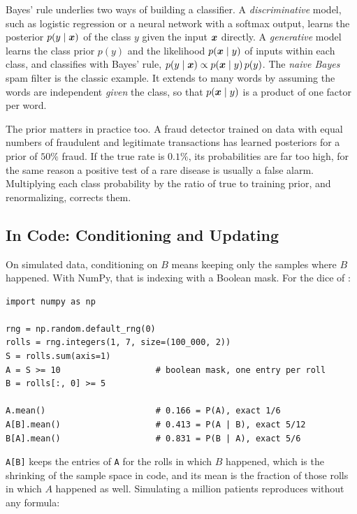 \begin{aibox}
  Bayes' rule underlies two ways of building a classifier. A
  \emph{discriminative} model, such as logistic regression or a neural
  network with a softmax output, learns the posterior $p(y \mid
  \bm{x})$ of the class $y$ given the input $\bm{x}$ directly. A
  \emph{generative} model learns the class prior $p(y)$ and the
  likelihood $p(\bm{x} \mid y)$ of inputs within each class, and
  classifies with Bayes' rule, $p(y \mid \bm{x}) \propto p(\bm{x}
  \mid y)\, p(y)$. The \emph{naive Bayes} spam filter is the classic
  example. It extends  to many words by assuming the
  words are independent \emph{given} the class, so that $p(\bm{x}
  \mid y)$ is a product of one factor per word.

  The prior matters in practice too. A fraud detector trained on data
  with equal numbers of fraudulent and legitimate transactions has
  learned posteriors for a prior of $50\%$ fraud. If the true rate is
  $0.1\%$, its probabilities are far too high, for the same reason a
  positive test of a rare disease is usually a false alarm. Multiplying
  each class probability by the ratio of true to training prior, and
  renormalizing, corrects them.
\end{aibox}

\subsection{In Code: Conditioning and Updating}
\label{sec:ch05-bayes-code}

On simulated data, conditioning on $B$ means keeping only the samples
where $B$ happened. With NumPy, that is indexing with a Boolean mask.
For the dice of :

\begin{lstlisting}
import numpy as np

rng = np.random.default_rng(0)
rolls = rng.integers(1, 7, size=(100_000, 2))
S = rolls.sum(axis=1)
A = S >= 10                   # boolean mask, one entry per roll
B = rolls[:, 0] >= 5

A.mean()                      # 0.166 = P(A), exact 1/6
A[B].mean()                   # 0.413 = P(A | B), exact 5/12
B[A].mean()                   # 0.831 = P(B | A), exact 5/6
\end{lstlisting}

\texttt{A[B]} keeps the entries of \texttt{A} for the rolls in which
$B$ happened, which is the shrinking of the sample space in code, and
its mean is the fraction of those rolls in which $A$ happened as well.
Simulating a million patients reproduces 
without any formula:


